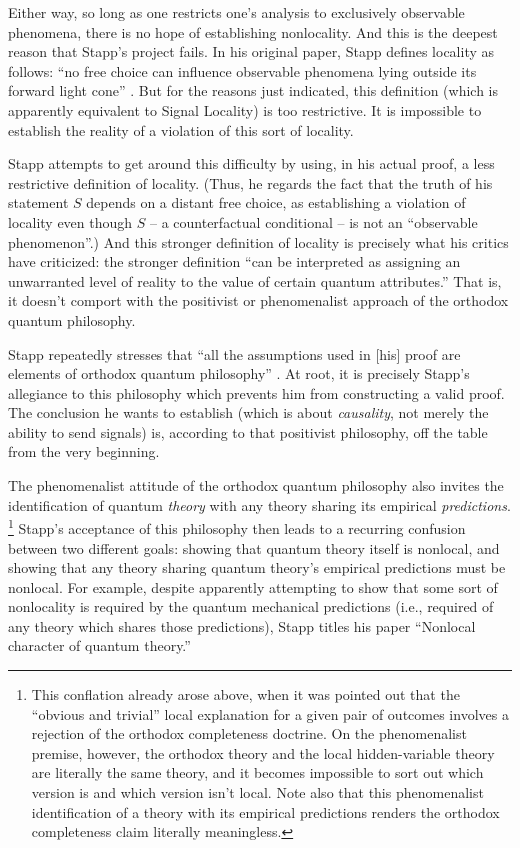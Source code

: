 \documentclass[aps,prc,onecolumn,12pt]{revtex4-2}
\begin{document}
Either way, so long as one restricts one's analysis
to exclusively observable phenomena, there is no hope of
establishing nonlocality.
And this is the deepest reason that Stapp's project fails.  In his
original paper, Stapp defines locality as follows:  ``no free choice
can influence observable phenomena lying outside its forward light
cone'' \cite{stapp1}.  But for the reasons just indicated, this
definition (which is apparently equivalent to Signal Locality) is
too restrictive.  It is impossible to establish the reality of a violation of
this sort of locality.

Stapp attempts to get around this difficulty
by using, in his actual proof, a less restrictive definition of locality.
(Thus, he regards the fact that the truth of his statement $S$
depends on a distant free choice, as establishing a violation of
locality even though $S$ -- a counterfactual conditional -- is not an
``observable phenomenon''.)  And this stronger definition of locality
is precisely what his critics have criticized:  the stronger
definition ``can be interpreted as assigning an unwarranted level of
reality to the value of certain quantum attributes.''  \cite{unruh}
That is, it doesn't comport with the positivist or phenomenalist
approach of the orthodox quantum philosophy.

Stapp repeatedly stresses that ``all the
assumptions used in [his] proof are elements of orthodox quantum
philosophy'' \cite{stappresponse}.  At root, it is precisely Stapp's
allegiance to this philosophy which prevents him from constructing a
valid proof.  The conclusion he wants to establish (which is about
\emph{causality}, not merely the ability to send signals) is,
according to that positivist philosophy, off the table
from the very beginning.

The phenomenalist attitude of the orthodox quantum philosophy also
invites the identification of quantum \emph{theory} with any theory
sharing its empirical \emph{predictions}.
\footnote{This conflation already arose above,
  when it was pointed out that the ``obvious and trivial'' local
  explanation for a given pair of outcomes involves a rejection of the
  orthodox completeness doctrine.  On the phenomenalist premise,
  however, the orthodox theory and the local hidden-variable theory
  are literally the same theory, and it becomes impossible to sort out
  which version is and which version isn't local.  Note also that this
  phenomenalist identification of a theory with its empirical
  predictions renders the orthodox completeness claim literally
  meaningless.}
Stapp's acceptance of this philosophy then leads to a recurring confusion
between two different goals:  showing that quantum theory
itself is nonlocal, and showing that any theory sharing quantum
theory's empirical predictions must be nonlocal.  For example, despite
apparently attempting to show
that some sort of nonlocality is required by the quantum mechanical
predictions (i.e., required of any theory which shares those
predictions), Stapp titles his paper ``Nonlocal character of quantum
theory.''
\end{document}
